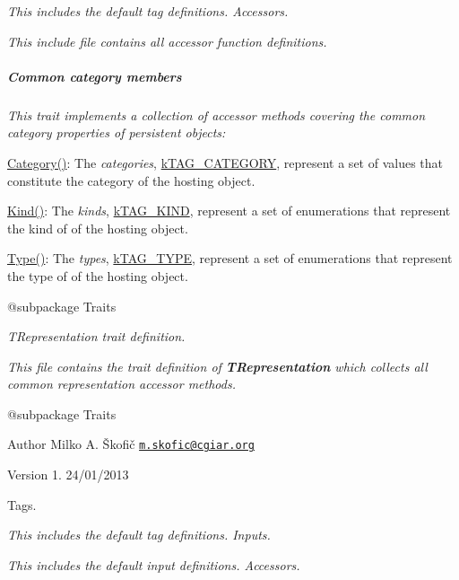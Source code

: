 {\itshape This includes the default tag definitions. Accessors.}

{\itshape This include file contains all accessor function definitions. \subparagraph*{Common category members}}

{\itshape }

{\itshape This trait implements a collection of accessor methods covering the common category properties of persistent objects\-:}

{\itshape 
\begin{DoxyItemize}
\item {\ttfamily \hyperlink{}{Category()}}\-: The {\itshape categories}, \hyperlink{}{k\-T\-A\-G\-\_\-\-C\-A\-T\-E\-G\-O\-R\-Y}, represent a set of values that constitute the category of the hosting object. 
\item {\ttfamily \hyperlink{}{Kind()}}\-: The {\itshape kinds}, \hyperlink{}{k\-T\-A\-G\-\_\-\-K\-I\-N\-D}, represent a set of enumerations that represent the kind of of the hosting object. 
\item {\ttfamily \hyperlink{}{Type()}}\-: The {\itshape types}, \hyperlink{}{k\-T\-A\-G\-\_\-\-T\-Y\-P\-E}, represent a set of enumerations that represent the type of of the hosting object. 
\end{DoxyItemize}}

{\itshape \begin{DoxyVerb} @subpackage        Traits\end{DoxyVerb}
}

{\itshape {\itshape T\-Representation} trait definition.}

{\itshape This file contains the trait definition of {\bfseries T\-Representation} which collects all common representation accessor methods.}

{\itshape \begin{DoxyVerb} @subpackage        Traits
\end{DoxyVerb}
}

{\itshape \begin{DoxyAuthor}{Author}
Milko A. Škofič \href{mailto:m.skofic@cgiar.org}{\tt m.\-skofic@cgiar.\-org} 
\end{DoxyAuthor}
\begin{DoxyVersion}{Version}
1. 24/01/2013
\end{DoxyVersion}
Tags.}

{\itshape This includes the default tag definitions. Inputs.}

{\itshape This includes the default input definitions. Accessors.}

